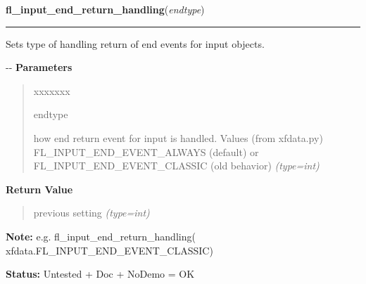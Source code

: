 \hspace{.8\funcindent}\begin{boxedminipage}{\funcwidth}

    \raggedright \textbf{fl\_input\_end\_return\_handling}(\textit{endtype})

    \vspace{-1.5ex}

    \rule{\textwidth}{0.5\fboxrule}
\setlength{\parskip}{2ex}

Sets type of handling return of end events for input objects.

-{}-
\setlength{\parskip}{1ex}
      \textbf{Parameters}
      \vspace{-1ex}

      \begin{quote}
        \begin{Ventry}{xxxxxxx}

          \item[endtype]


how end return event for input is handled. Values (from xfdata.py)
FL\_INPUT\_END\_EVENT\_ALWAYS (default) or FL\_INPUT\_END\_EVENT\_CLASSIC
(old behavior)
            {\it (type=int)}

        \end{Ventry}

      \end{quote}

      \textbf{Return Value}
    \vspace{-1ex}

      \begin{quote}

previous setting
      {\it (type=int)}

      \end{quote}

\textbf{Note:} 
e.g. fl\_input\_end\_return\_handling(         xfdata.FL\_INPUT\_END\_EVENT\_CLASSIC)


\textbf{Status:} 
Untested + Doc + NoDemo = OK


    \end{boxedminipage}

    \label{xformslib:flbasic:fl_add_timeout}

    \vspace{0.5ex}

